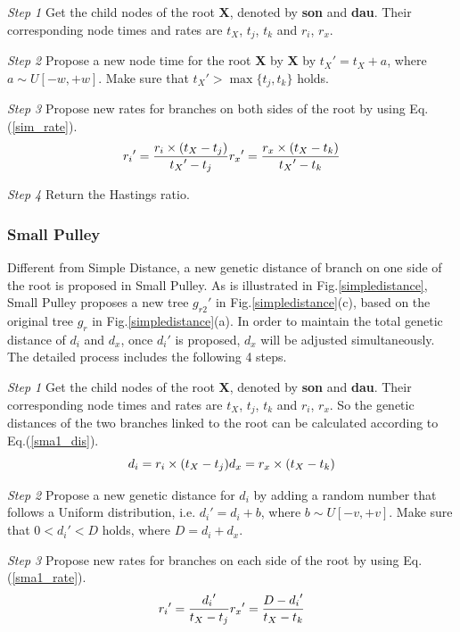 \documentclass{bmcart}
\begin{document}
\emph{Step 1} Get the child nodes of the root \textbf{X}, denoted by \textbf{son} and \textbf{dau}. Their corresponding node times and rates are $t_X$, $t_j$, $t_k$ and $r_i$, $r_x$.

\emph{Step 2} Propose a new node time for the root \textbf{X} by \textbf{X} by ${t_X}' = {t_X} + a$, where $a \sim U[ - w, + w]$. Make sure that ${t_X}' > \max \{ {t_j},{t_k}\} $ holds.

\emph{Step 3} Propose new rates for branches on both sides of the root by using Eq.(\ref{sim_rate}).
\begin{equation}
\label{sim_rate}
{r_i}' = \frac{{{r_i} \times ({{t_X} - {t_j}})}}{{{t_X}' - {t_j}}}\\
{r_x}' = \frac{{{r_x} \times ({{t_X} - {t_k}})}}{{{t_X}' - {t_k}}}
 \end{equation}

\emph{Step 4} Return the Hastings ratio.
\subsubsection*{Small Pulley}
Different from Simple Distance, a new genetic distance of branch on one side of the root is proposed in Small Pulley. As is illustrated in Fig.\ref{simpledistance}, Small Pulley proposes a new tree ${g_{r2}}'$ in Fig.\ref{simpledistance}(c), based on the original tree $g_r$ in Fig.\ref{simpledistance}(a). In order to maintain the total genetic distance of $d_i$ and $d_x$, once ${d_i}'$ is proposed, $d_x$ will be adjusted simultaneously. The detailed process includes the following 4 steps.

\emph{Step 1} Get the child nodes of the root \textbf{X}, denoted by \textbf{son} and \textbf{dau}. Their corresponding node times and rates are $t_X$, $t_j$, $t_k$ and $r_i$, $r_x$. So the genetic distances of the two branches linked to the root can be calculated according to Eq.(\ref{sma1_dis}).
\begin{equation}
\label{sma1_dis}
{d_i} = {r_i} \times ({{t_X} - {t_j}})\\
{d_x} = {r_x} \times ({{t_X} - {t_k}})
 \end{equation}

\emph{Step 2} Propose a new genetic distance for $d_i$ by adding a random number that follows a Uniform distribution, i.e.  ${d_i}' = {d_i} + b$, where $b \sim U[ - v, + v]$. Make sure that $0 < {d_i}' < D$ holds, where $D = {d_i} + {d_x}$.

\emph{Step 3} Propose new rates for branches on each side of the root by using Eq.(\ref{sma1_rate}).
\begin{equation}
\label{sma1_rate}
{r_i}' = \frac{{{d_i}'}}{{{t_X} - {t_j}}}\\
{r_x}' = \frac{{D - {d_i}'}}{{{t_X} - {t_k}}}
 \end{equation}
\end{document}
